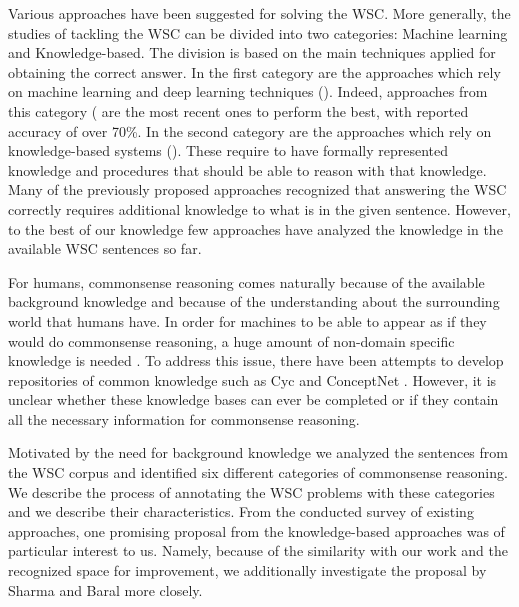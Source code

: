 Various approaches have been suggested for solving the WSC.
More generally, the studies of tackling the WSC can be divided into two categories: Machine learning and Knowledge-based. 
The division is based on the main techniques applied for obtaining the correct answer. In the first category are the approaches which rely on machine learning and deep learning techniques (\cite{DBLP:conf/emnlp/RahmanN12, DBLP:journals/corr/LiuJLZWH16,  DBLP:journals/corr/abs-1806-02847}). Indeed, approaches from this category (\cite{DBLP:journals/corr/abs-1806-02847, radford2019language} are the most recent ones to perform the best, with reported accuracy of over 70\%. In the second category are the approaches which rely on knowledge-based systems (\cite{DBLP:conf/aaai/SharmaB16,DBLP:conf/emnlp/EmamiCTSC18,DBLP:conf/kr/Schuller14}). These require to have formally represented knowledge and procedures that should be able to reason with that knowledge. Many of the previously proposed approaches \cite{DBLP:conf/ijcai/SharmaVAB15, DBLP:conf/kr/Schuller14, DBLP:journals/corr/LiuJLZWH16, DBLP:conf/emnlp/EmamiCTSC18} recognized that answering the WSC correctly requires additional knowledge to what is in the given sentence. However, to the best of our knowledge few approaches have analyzed the knowledge in the available WSC sentences so far. 

For humans, commonsense reasoning comes naturally  because of the available background knowledge and because of the understanding about the surrounding world that humans have. In order for machines to be able to appear as if they would do commonsense reasoning, a huge amount of non-domain specific knowledge is needed \cite{DBLP:journals/ibmsj/McCarthyMSGLMMRSS02}. To address this issue, there have been attempts to develop repositories of common knowledge such as Cyc \cite{DBLP:journals/cacm/Lenat95} and ConceptNet \cite{articleC}. However, it is unclear whether these knowledge bases can ever be completed or if they contain all the necessary information for commonsense reasoning. 

Motivated by the need for background knowledge we analyzed the sentences from the WSC corpus and identified six different categories of commonsense reasoning. We describe the process of annotating the WSC problems with these categories and we describe their characteristics. 
From the conducted survey of existing approaches, one promising proposal from the knowledge-based approaches was of particular interest to us. Namely, because of the similarity with our work and the recognized space for improvement, we additionally investigate the proposal by Sharma and Baral \cite{2018CommonsenseKT} more closely.


